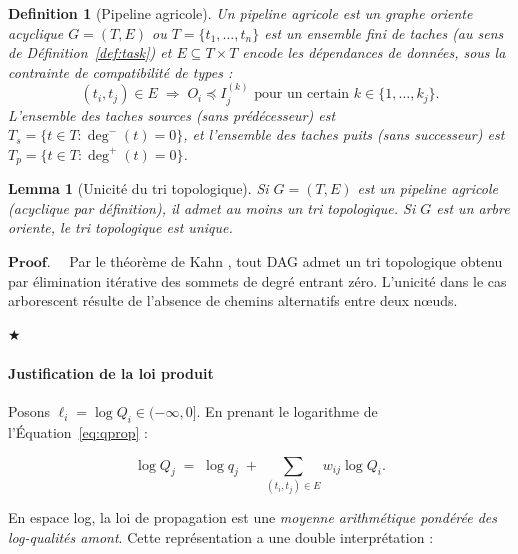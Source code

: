 \documentclass[12pt]{article}
\newtheorem{lemma}[theorem]{Lemma}
\newtheorem{definition}{Definition}[section]
\newenvironment{proof}{$\mathbf{Proof.\quad}$}{\begin{flushright}$\bigstar$\end{flushright}}
\begin{document}
\begin{definition}[Pipeline agricole]
	\label{def:pipeline}
	Un \emph{pipeline agricole} est un graphe oriente acyclique
	$G = (T, E)$ ou $T = \{t_1,\ldots,t_n\}$ est un ensemble fini de
	taches (au sens de Définition~\ref{def:task}) et $E \subseteq T \times T$
	encode les dépendances de données, sous la contrainte de compatibilité
	de types :
	\[
	(t_i, t_j) \in E \;\Rightarrow\;
	O_i \preceq I_j^{(k)} \text{ pour un certain } k \in \{1,\ldots,k_j\}.
	\]
	L'ensemble des taches sources (sans prédécesseur) est
	$T_s = \{t \in T : \deg^{-}(t) = 0\}$, et l'ensemble des taches
	puits (sans successeur) est
	$T_p = \{t \in T : \deg^{+}(t) = 0\}$.
\end{definition}

\begin{lemma}[Unicité du tri topologique]
\label{lem:topo}
Si $G=(T,E)$ est un pipeline agricole (acyclique par définition),
il admet au moins un tri topologique. Si $G$ est un arbre oriente,
le tri topologique est unique.
\end{lemma}

\begin{proof}
Par le théorème de Kahn \cite{kahn_topological}, tout DAG admet un
tri topologique obtenu par élimination itérative des sommets de
degré entrant zéro. L’unicité dans le cas arborescent résulte de
l'absence de chemins alternatifs entre deux nœuds.
\end{proof}
\paragraph{Justification de la loi produit}
\label{subsec:product_justification}

Posons $\ell_i = \log Q_i \in (-\infty, 0]$. En prenant le logarithme
de l’Équation~\eqref{eq:qprop} :

\begin{equation}
	\log Q_j \;=\; \log q_j \;+\; \sum_{(t_i,t_j)\in E} w_{ij} \log Q_i.
	\label{eq:logprop}
\end{equation}

En espace log, la loi de propagation est une \emph{moyenne arithmétique
	pondérée des log-qualités amont}. Cette représentation a une double
interprétation :
\end{document}
